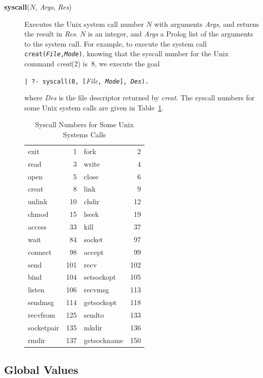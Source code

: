 \begin{description}
\item[{\bf syscall}($N$, {\em Args}, {\em Res})]
    Executes the Unix system call number $N$ with arguments {\em Args},
    and returns the result in {\em Res}.
    $N$ is an integer, and {\em Args} a Prolog list of the arguments
    to the system call.
    For example, to execute the system call {\tt creat({\em File},{\em Mode})},
    knowing that the syscall number for the Unix command {\em creat}(2) is~8,
    we execute the goal
    \begin{center}
    {\verb;| ?- syscall(8, [;{\em File}{\tt , {\em Mode}], {\em Des}).}}
    \end{center}
    where {\em Des} is the file descriptor returned by {\em creat}.
    The syscall numbers for some Unix system calls are given
    in Table~\ref{unixsystemcalls}.
\begin{table}[htbp]\centering
\begin{tabular}{|lr|lr|}\hline
exit & 1 & fork & 2\\
read & 3 & write & 4\\
open & 5 & close & 6\\
creat & 8 & link & 9\\
unlink & 10 & chdir & 12\\
chmod & 15 & lseek & 19\\
access & 33 & kill & 37\\
wait & 84 & socket & 97\\
connect & 98 & accept & 99\\
send & 101 & recv & 102\\
bind & 104 & setsockopt & 105\\
listen & 106 & recvmsg & 113\\
sendmsg & 114 & getsockopt & 118\\
recvfrom & 125 & sendto & 133\\
socketpair & 135 & mkdir & 136\\
rmdir & 137 & getsockname & 150\\
\hline
\end{tabular}
\caption{Syscall Numbers for Some Unix Systems Calls}\label{unixsystemcalls}
\end{table}
\end{description}

\subsection{Global Values}

